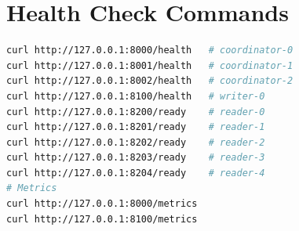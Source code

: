 \documentclass[11pt,a4paper]{article}
\begin{document}
\section{Health Check Commands}

\begin{lstlisting}[language=bash, caption={Health and readiness checks for all services.}]
curl http://127.0.0.1:8000/health   # coordinator-0
curl http://127.0.0.1:8001/health   # coordinator-1
curl http://127.0.0.1:8002/health   # coordinator-2
curl http://127.0.0.1:8100/health   # writer-0
curl http://127.0.0.1:8200/ready    # reader-0
curl http://127.0.0.1:8201/ready    # reader-1
curl http://127.0.0.1:8202/ready    # reader-2
curl http://127.0.0.1:8203/ready    # reader-3
curl http://127.0.0.1:8204/ready    # reader-4
# Metrics
curl http://127.0.0.1:8000/metrics
curl http://127.0.0.1:8100/metrics
\end{lstlisting}
\end{document}
